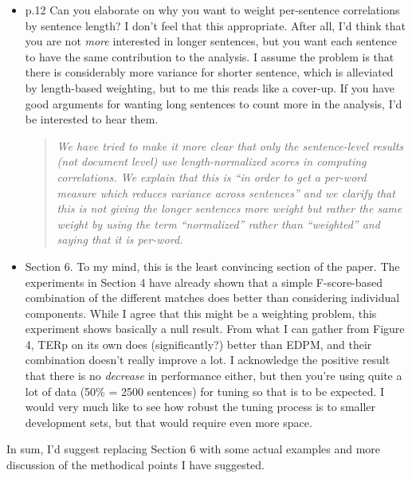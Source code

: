 \documentclass[letterpaper,12pt]{article}
\newenvironment{response}
{\begin{quotation} \it}
  {\end{quotation}}
\begin{document}
\begin{itemize}
\item  p.12 Can you elaborate on why you want to weight per-sentence
  correlations by sentence length? I don't feel that this
  appropriate. After all, I'd think that you are not \emph{more}
  interested in longer sentences, but you want each sentence to have
  the same contribution to the analysis. I assume the problem is that
  there is considerably more variance for shorter sentence, which is
  alleviated by length-based weighting, but to me this reads like a
  cover-up. If you have good arguments for wanting long sentences to
  count more in the analysis, I'd be interested to hear them.
  \begin{response}
  We have tried to make it more clear that only the sentence-level results (not document level) use length-normalized scores in computing correlations. We explain that this is ``in order to get a per-word measure which reduces variance across sentences'' and we clarify that this is not giving the longer sentences more weight but rather the same weight by using the term ``normalized'' rather than ``weighted'' and saying that it is per-word.
  \end{response}

\item  Section 6. To my mind, this is the least convincing section of the
  paper. The experiments in Section 4 have already shown that a simple
  F-score-based combination of the different matches does better than
  considering individual components. While I agree that this might be
  a weighting problem, this experiment shows basically a null result.
  From what I can gather from Figure 4, TERp on its own does
  (significantly?) better than EDPM, and their combination doesn't
  really improve a lot. I acknowledge the positive result that there
  is no \emph{decrease} in performance either, but then you're using
  quite a lot of data (50\% = 2500 sentences) for tuning so that is to
  be expected. I would very much like to see how robust the tuning
  process is to smaller development sets, but that would require even
  more space.
\end{itemize}
In sum, I'd suggest replacing Section 6 with some actual examples and
more discussion of the methodical points I have suggested.
\end{document}
